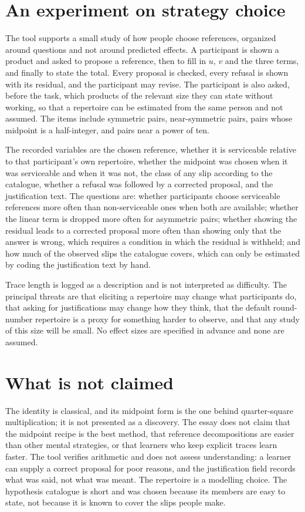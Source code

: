 \documentclass[11pt]{article}
\theoremstyle{definition}
\theoremstyle{remark}
\begin{document}
\section{An experiment on strategy choice}

The tool supports a small study of how people choose references, organized around questions and not around predicted effects. A participant is shown a product and asked to propose a reference, then to fill in $u$, $v$ and the three terms, and finally to state the total. Every proposal is checked, every refusal is shown with its residual, and the participant may revise. The participant is also asked, before the task, which products of the relevant size they can state without working, so that a repertoire can be estimated from the same person and not assumed. The items include symmetric pairs, near-symmetric pairs, pairs whose midpoint is a half-integer, and pairs near a power of ten.

The recorded variables are the chosen reference, whether it is serviceable relative to that participant's own repertoire, whether the midpoint was chosen when it was serviceable and when it was not, the class of any slip according to the catalogue, whether a refusal was followed by a corrected proposal, and the justification text. The questions are: whether participants choose serviceable references more often than non-serviceable ones when both are available; whether the linear term is dropped more often for asymmetric pairs; whether showing the residual leads to a corrected proposal more often than showing only that the answer is wrong, which requires a condition in which the residual is withheld; and how much of the observed slips the catalogue covers, which can only be estimated by coding the justification text by hand.

Trace length is logged as a description and is not interpreted as difficulty. The principal threats are that eliciting a repertoire may change what participants do, that asking for justifications may change how they think, that the default round-number repertoire is a proxy for something harder to observe, and that any study of this size will be small. No effect sizes are specified in advance and none are assumed.

\section{What is not claimed}

The identity is classical, and its midpoint form is the one behind quarter-square multiplication; it is not presented as a discovery. The essay does not claim that the midpoint recipe is the best method, that reference decompositions are easier than other mental strategies, or that learners who keep explicit traces learn faster. The tool verifies arithmetic and does not assess understanding: a learner can supply a correct proposal for poor reasons, and the justification field records what was said, not what was meant. The repertoire is a modelling choice. The hypothesis catalogue is short and was chosen because its members are easy to state, not because it is known to cover the slips people make.
\end{document}
